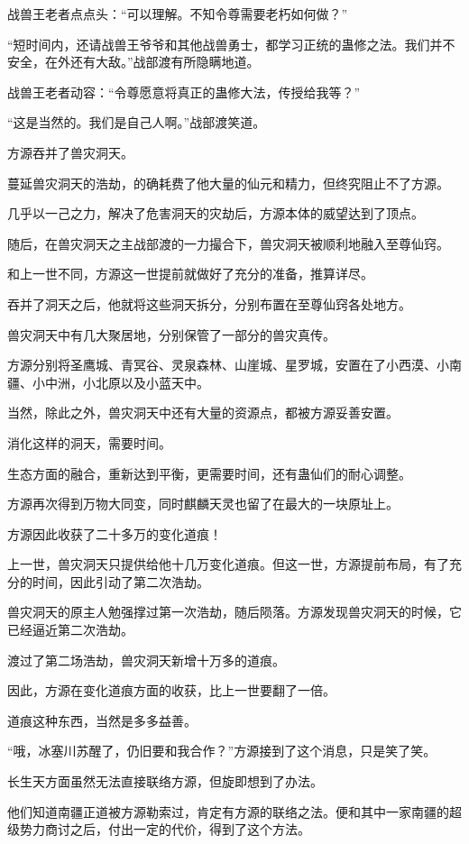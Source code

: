 \begin{this_body}
战兽王老者点点头：“可以理解。不知令尊需要老朽如何做？”

“短时间内，还请战兽王爷爷和其他战兽勇士，都学习正统的蛊修之法。我们并不安全，在外还有大敌。”战部渡有所隐瞒地道。

战兽王老者动容：“令尊愿意将真正的蛊修大法，传授给我等？”

“这是当然的。我们是自己人啊。”战部渡笑道。

方源吞并了兽灾洞天。

蔓延兽灾洞天的浩劫，的确耗费了他大量的仙元和精力，但终究阻止不了方源。

几乎以一己之力，解决了危害洞天的灾劫后，方源本体的威望达到了顶点。

随后，在兽灾洞天之主战部渡的一力撮合下，兽灾洞天被顺利地融入至尊仙窍。

和上一世不同，方源这一世提前就做好了充分的准备，推算详尽。

吞并了洞天之后，他就将这些洞天拆分，分别布置在至尊仙窍各处地方。

兽灾洞天中有几大聚居地，分别保管了一部分的兽灾真传。

方源分别将圣鹰城、青冥谷、灵泉森林、山崖城、星罗城，安置在了小西漠、小南疆、小中洲，小北原以及小蓝天中。

当然，除此之外，兽灾洞天中还有大量的资源点，都被方源妥善安置。

消化这样的洞天，需要时间。

生态方面的融合，重新达到平衡，更需要时间，还有蛊仙们的耐心调整。

方源再次得到万物大同变，同时麒麟天灵也留了在最大的一块原址上。

方源因此收获了二十多万的变化道痕！

上一世，兽灾洞天只提供给他十几万变化道痕。但这一世，方源提前布局，有了充分的时间，因此引动了第二次浩劫。

兽灾洞天的原主人勉强撑过第一次浩劫，随后陨落。方源发现兽灾洞天的时候，它已经逼近第二次浩劫。

渡过了第二场浩劫，兽灾洞天新增十万多的道痕。

因此，方源在变化道痕方面的收获，比上一世要翻了一倍。

道痕这种东西，当然是多多益善。

“哦，冰塞川苏醒了，仍旧要和我合作？”方源接到了这个消息，只是笑了笑。

长生天方面虽然无法直接联络方源，但旋即想到了办法。

他们知道南疆正道被方源勒索过，肯定有方源的联络之法。便和其中一家南疆的超级势力商讨之后，付出一定的代价，得到了这个方法。


\end{this_body}
